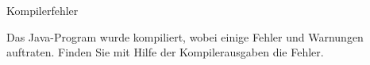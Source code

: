\begin{frame}[t]%
\medskip

\begin{exercise}{Kompilerfehler}
\begin{body}
Das Java-Program  wurde kompiliert, wobei einige Fehler und Warnungen auftraten.
Finden Sie mit Hilfe der Kompilerausgaben die Fehler.

\end{body}
\end{exercise}
\end{frame}

